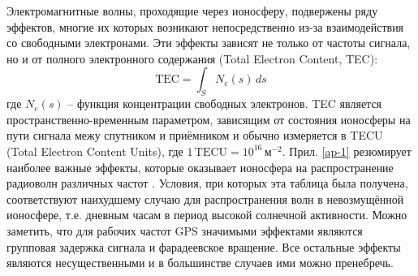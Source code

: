 Электромагнитные волны, проходящие через ионосферу, подвержены ряду эффектов, многие их которых возникают непосредственно из-за взаимодействия со свободными электронами.
Эти эффекты зависят не только от частоты сигнала, но и от полного электронного содержания (Total Electron Content, TEC):
\begin{equation}
\text{TEC}=\int_S N_e(s)\,ds    
\end{equation}
где 
$N_e(s)$ -- функция концентрации свободных электронов.  
TEC является пространственно-временным параметром, зависящим от состояния ионосферы на пути сигнала межу спутником и приёмником и обычно измеряется в TECU (Total Electron Content Units), где $1\,\text{TECU}=10^{16}\,\text{м}^{-2}$.
Прил. \ref{ap-1} резюмирует наиболее важные эффекты, которые оказывает ионосфера на распространение радиоволн различных частот \cite{ITU-R2015}.
Условия, при которых эта таблица была получена, соответствуют наихудшему случаю для распространения волн в невозмущённой ионосфере, т.е. дневным часам в период высокой солнечной активности. 
Можно заметить, что для рабочих частот GPS значимыми эффектами являются групповая задержка сигнала и фарадеевское вращение.
Все остальные эффекты являются несущественными и в большинстве случаев ими можно пренебречь.